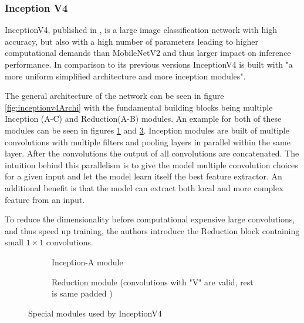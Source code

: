 \subsubsection{Inception V4}
InceptionV4, published in \cite{InceptionV4}, is a large image classification network with high accuracy, but also with a high number of parameters leading to higher computational demands than MobileNetV2 and thus larger impact on inference performance.
In comparison to its previous versions InceptionV4 is built with "a more uniform simplified architecture and more inception modules". 

The general architecture of the network can be seen in figure \ref{fig:inceptionv4Archi} with the fundamental building blocks being multiple Inception (A-C) and Reduction(A-B) modules. 
An example for both of these modules can be seen in figures \ref{fig:InceptionA} and \ref{fig:InceptionReduction}.
Inception modules are built of multiple convolutions with multiple filters and pooling layers in parallel within the same layer.
After the convolutions the output of all convolutions are concatenated.
The intuition behind this parallelism is to give the model multiple convolution choices for a given input and let the model learn itself the best feature extractor. An additional benefit is that the model can extract both local and more complex feature from an input.

To reduce the dimensionality before computational expensive large convolutions, and thus speed up training, the authors introduce the Reduction block containing small $1\times1$ convolutions.   %




\begin{figure}[!htb]
\centering
\begin{subfigure}[b]{.95\textwidth}
\centering
   \resizebox{.8\linewidth}{!}{}
   \caption{Inception-A module}
   \label{fig:InceptionA} 
\end{subfigure}

\vspace{1em}
\begin{subfigure}[b]{.95\textwidth}
\centering
   \resizebox{.6\linewidth}{!}{}
   \caption{Reduction module (convolutions with "V" are valid, rest is same padded )}
   \label{fig:InceptionReduction}
\end{subfigure}

\caption{Special modules used by InceptionV4}

\end{figure}




